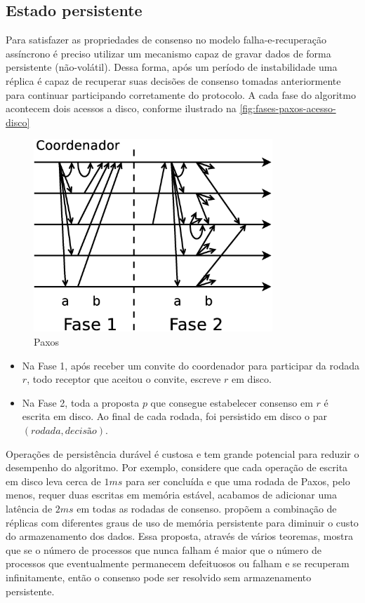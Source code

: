 \subsection{Estado persistente}

Para satisfazer as propriedades de consenso no modelo falha-e-recuperação assíncrono é
preciso utilizar um mecanismo capaz de gravar dados de forma persistente (não-volátil).
Dessa forma, após um período de instabilidade uma réplica é capaz de recuperar suas
decisões de  consenso tomadas anteriormente para continuar participando corretamente do
protocolo. A cada fase do algoritmo acontecem dois acessos a disco, conforme ilustrado na
\autoref{fig:fases-paxos-acesso-disco}

\begin{figure}[htbp]
  \centering
  \includegraphics[width=9cm]{conteudo/capitulos/figuras/paxos.dia.eps}
  \caption{Paxos}
  \label{fig:fases-paxos-acesso-disco}
\end{figure}

\begin{itemize}
  \item Na Fase 1, após receber um convite do coordenador para participar da rodada $r$,
    todo receptor que aceitou o convite, escreve $r$ em disco.
  \item Na Fase 2, toda a proposta $p$ que consegue estabelecer consenso em $r$ é
    escrita em disco. Ao final de cada rodada, foi persistido em disco o par $(rodada,
    decisão)$.
\end{itemize}

Operações de persistência durável é custosa e tem grande potencial para reduzir o
desempenho do algoritmo. Por exemplo, considere que cada operação de escrita em disco leva
cerca de $1ms$ para ser concluída e que uma rodada de Paxos, pelo menos, requer duas
escritas em memória estável, acabamos de adicionar uma latência de $2ms$ em todas as
rodadas de consenso.  propõem a combinação de réplicas com
diferentes graus de uso de memória persistente para diminuir o custo do armazenamento dos
dados. Essa proposta, através de vários teoremas, mostra que se o número de processos que
nunca falham é maior que o número de processos que eventualmente permanecem defeituosos ou
falham e se recuperam infinitamente, então o consenso pode ser resolvido sem armazenamento
persistente.

